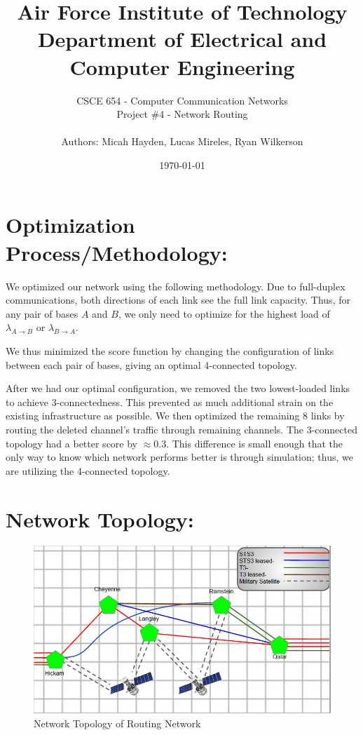 \documentclass{article}
\title{Air Force Institute of Technology \\ Department of Electrical and Computer Engineering}
\author{CSCE 654 - Computer Communication Networks \\ Project \#4 - Network Routing \\ \\ Authors:  Micah Hayden, Lucas Mireles, Ryan Wilkerson }
\date{\today}
\begin{document}
\maketitle
\vspace{-1cm}
\section{Optimization Process/Methodology:}
We optimized our network using the following methodology.
Due to full-duplex communications, both directions of each link see the full link capacity.
Thus, for any pair of bases $A$ and $B$, we only need to optimize for the highest load of $\lambda_{A \rightarrow B}$ or $\lambda_{B \rightarrow A}$.

We thus minimized the score function by changing the configuration of links between each pair of bases, giving an optimal 4-connected topology.

After we had our optimal configuration, we removed the two lowest-loaded links to achieve 3-connectedness. 
This prevented as much additional strain on the existing infrastructure as possible.
We then optimized the remaining 8 links by routing the deleted channel's traffic through remaining channels.
The 3-connected topology had a better score by $\approx 0.3$.
This difference is small enough that the only way to know which network performs better is through simulation; thus, we are utilizing the 4-connected topology.

\section{Network Topology:}
\label{sec:Topology}

\begin{figure}[h!]
\centering
\includegraphics[scale=0.75]{Images/Topology.PNG}
\caption{Network Topology of Routing Network}
\label{fig:Topology}
\end{figure}
\end{document}
